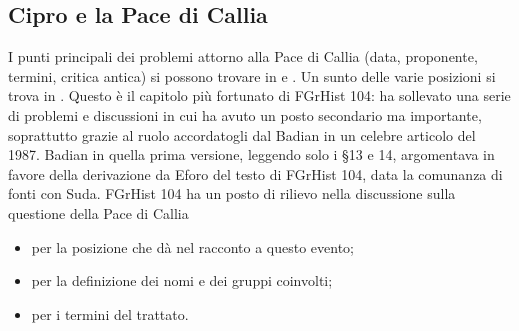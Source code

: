 {            \subsection*{Cipro e la Pace di Callia}\label{bkm:RefHeading717011501267828}
             I punti principali dei problemi attorno alla Pace di Callia (data, proponente, termini, critica antica) si possono trovare in \cite[487-495]{Meiggs1972} e \cite[1-72]{Badian1993}. Un sunto delle varie posizioni si trova in \cite{Lachhein2008}. Questo è il capitolo più fortunato di FGrHist 104: ha sollevato una serie di problemi e discussioni in cui ha avuto un posto secondario ma importante, soprattutto grazie al ruolo accordatogli dal Badian in un celebre articolo del 1987. Badian in quella prima versione, leggendo solo i §13 e 14, argomentava in favore della derivazione da Eforo del testo di FGrHist 104, data la comunanza di fonti con Suda. FGrHist 104 ha un posto di rilievo nella discussione sulla questione della Pace di Callia 
\begin{itemize}
\item per la posizione che dà nel racconto a questo evento;
\item per la definizione dei nomi e dei gruppi coinvolti;
\item per i termini del trattato. 
\end{itemize}
}
